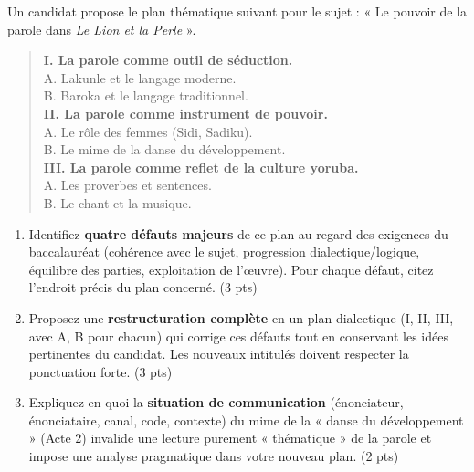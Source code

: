 \documentclass[11pt]{article}
\begin{document}
\begin{exercice}
Un candidat propose le plan thématique suivant pour le sujet : « Le pouvoir de la parole dans \textit{Le Lion et la Perle} ».
\begin{quote}
\textbf{I. La parole comme outil de séduction.} \\
A. Lakunle et le langage moderne. \\
B. Baroka et le langage traditionnel. \\
\textbf{II. La parole comme instrument de pouvoir.} \\
A. Le rôle des femmes (Sidi, Sadiku). \\
B. Le mime de la danse du développement. \\
\textbf{III. La parole comme reflet de la culture yoruba.} \\
A. Les proverbes et sentences. \\
B. Le chant et la musique.
\end{quote}

\begin{enumerate}
    \item Identifiez \textbf{quatre défauts majeurs} de ce plan au regard des exigences du baccalauréat (cohérence avec le sujet, progression dialectique/logique, équilibre des parties, exploitation de l'œuvre). Pour chaque défaut, citez l'endroit précis du plan concerné. (3 pts)
    \item Proposez une \textbf{restructuration complète} en un plan dialectique (I, II, III, avec A, B pour chacun) qui corrige ces défauts tout en conservant les idées pertinentes du candidat. Les nouveaux intitulés doivent respecter la ponctuation forte. (3 pts)
    \item Expliquez en quoi la \textbf{situation de communication} (énonciateur, énonciataire, canal, code, contexte) du mime de la « danse du développement » (Acte 2) invalide une lecture purement « thématique » de la parole et impose une analyse pragmatique dans votre nouveau plan. (2 pts)
\end{enumerate}
\end{exercice}
\end{document}
